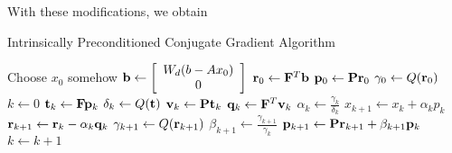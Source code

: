 With these modifications, we obtain 
\begin{algorithm}[H]
\caption{Intrinsically Preconditioned Conjugate Gradient Algorithm}
\begin{algorithmic}[1]
\State Choose $x_0$ somehow
\State ${\bf b} \gets \left[
\begin{array}{c}
W_d(b-Ax_0)\\
0
\end{array}
\right]$
  \State ${\bf r}_0 \gets {\bf F}^T{\bf b}$
  \State ${\bf p}_0 \gets {\bf P}{\bf r}_0$
  \State $\gamma_0 \gets Q({\bf r}_0)$
  \State $k \gets 0$
  \Repeat
  \State ${\bf t}_k \gets {\bf F}{\bf p}_k$
  \State $\delta_k \gets Q({\bf t})$
  \State ${\bf v}_k \gets {\bf P}{\bf t}_k$
  \State ${\bf q}_k \gets {\bf F}^T{\bf v}_k$
  \State $\alpha_k \gets \frac{\gamma_k}{\delta_k}$
  \State $x_{k+1} \gets x_k + \alpha_k p_k$
  \State ${\bf r}_{k+1} \gets {\bf r}_k - \alpha_k{\bf q}_k$
  \State $\gamma_{k+1} \gets Q({\bf r}_{k+1})$
  \State $\beta_{k+1} \gets \frac{\gamma_{k+1}}{\gamma_k}$
  \State ${\bf p}_{k+1}\gets {\bf P}{\bf r}_{k+1}+\beta_{k+1}{\bf p}_k$
  \State $k \gets k+1$
\end{algorithmic}
\end{algorithm}
